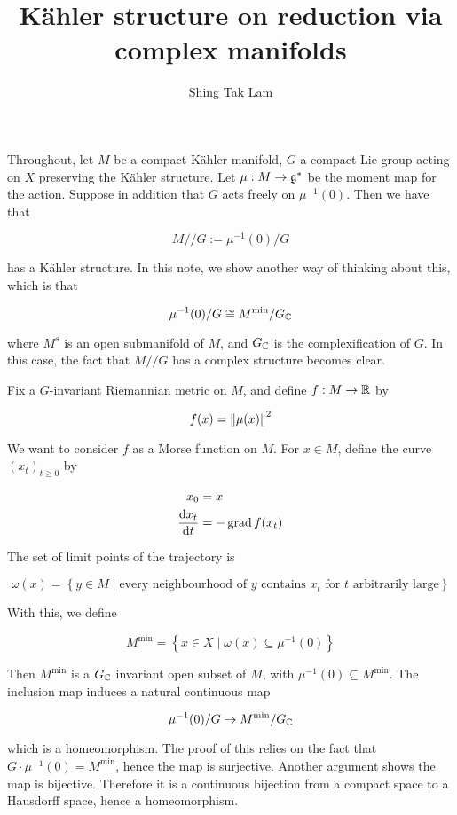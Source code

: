 \documentclass{article}
\title{K\"ahler structure on reduction via complex manifolds}
\author{Shing Tak Lam}
\newcommand{\sslash}{/\!/}
\DeclareMathOperator{\gr}{grad}
\begin{document}
\maketitle

Throughout, let \(M\) be a compact K\"ahler manifold, \(G\) a compact Lie group acting on \(X\) preserving the K\"ahler structure. Let \(\mu : M \to \mathfrak{g}^*\) be the moment map for the action. Suppose in addition that \(G\) acts freely on \(\mu^{-1}(0)\). Then we have that

\[M \sslash G := \mu^{-1}(0)/G\]

has a K\"ahler structure. In this note, we show another way of thinking about this, which is that

\[\mu^{-1}(0)/G \cong M^{\min} / G_{\mathbb{C}}\]

where \(M^s\) is an open submanifold of \(M\), and \(G_{\mathbb{C}}\) is the complexification of \(G\). In this case, the fact that \(M\sslash G\) has a complex structure becomes clear.

Fix a \(G\)-invariant Riemannian metric on \(M\), and define \(f : M \to \mathbb{R}\) by

\[f(x) = \norm{\mu(x)}^2\]

We want to consider \(f\) as a Morse function on \(M\). For \(x \in M\), define the curve \((x_t)_{t \ge 0}\) by

\begin{align*}
    x_0 &= x \\
    \dv{x_t}{t} &= -\gr f(x_t)
\end{align*}

The set of limit points of the trajectory is

\[\omega(x) = \left\{y \in M \mid \text{every neighbourhood of }y\text{ contains }x_t\text{ for }t\text{ arbitrarily large}\right\}\]

With this, we define

\[M^{\min} = \left\{x \in X \mid \omega(x) \subseteq \mu^{-1}(0)\right\}\]

Then \(M^{\min}\) is a \(G_{\mathbb{C}}\) invariant open subset of \(M\), with \(\mu^{-1}(0) \subseteq M^{\min}\). The inclusion map induces a natural continuous map

\[\mu^{-1}(0)/G \to M^{\min}/G_{\mathbb{C}}\]

which is a homeomorphism. The proof of this relies on the fact that \(G \cdot \mu^{-1}(0) = M^{\min}\), hence the map is surjective. Another argument shows the map is bijective. Therefore it is a continuous bijection from a compact space to a Hausdorff space, hence a homeomorphism.
\end{document}
